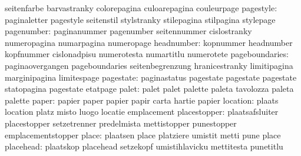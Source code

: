                            seitenfarbe               barvastranky
                           colorepagina              culoarepagina
                           couleurpage
                pagestyle: paginaletter              pagestyle
                           seitenstil                stylstranky
                           stilepagina               stilpagina
                           stylepage
               pagenumber: paginanummer              pagenumber
                           seitennummer              cislostranky
                           numeropagina              numarpagina
                           numeropage
               headnumber: kopnummer                 headnumber
                           kopfnummer                cislonadpisu
                           numerotesta               numartitlu
                           numerotete
           pageboundaries: paginaovergangen          pageboundaries
                           seitenbegrenzung          hranicestranky
                           limitipagina              marginipagina
                           limitespage
                pagestate: paginastatus              pagestate
                           pagestate                 pagestate
                           statopagina               pagestate
                           etatpage
                    palet: palet                     palet
                           palette                   paleta
                           tavolozza                 paleta
                           palette
                    paper: papier                    paper
                           papier                    papir
                           carta                     hartie
                           papier
                 location: plaats                    location
                           platz                     misto
                           luogo                     locatie
                           emplacement
             placestopper: plaatsafsluiter           placestopper
                           setzetrenner              predelmista
                           mettistopper              punestopper
                           emplacementstopper
                    place: plaatsen                  place
                           platziere                 umistit
                           metti                     pune
                           place
                placehead: plaatskop                 placehead
                           setzekopf                 umistihlavicku
                           mettitesta                punetitlu
